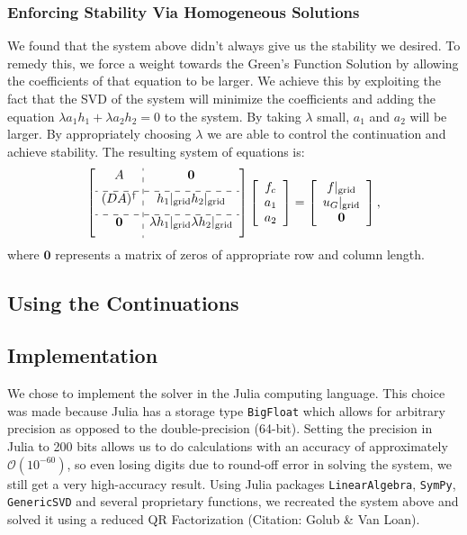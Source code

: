 \documentclass[11pt]{amsart}
\begin{document}
\subsubsection{Enforcing Stability Via Homogeneous Solutions}
We found that the system above didn't always give us the stability we desired. To remedy this, we force a weight towards the Green's Function Solution by allowing the coefficients of that equation to be larger.  We achieve this by exploiting the fact that the SVD of the system will minimize the coefficients and adding the equation $\lambda a_1 h_1 + \lambda a_2 h_2 = 0$ to the system.  By taking $\lambda$ small, $a_1$ and $a_2$ will be larger.  By appropriately choosing $\lambda$ we are able to control the continuation and achieve stability. 
The resulting system of equations is: 
\begin{equation}
\left[
\begin{array}{c:c}
A &  \mathbf{0} \\[6pt] \hdashline
(DA)^{\dagger} & h_1|_{\text{grid}} h_2|_{\text{grid}} \\[6pt] \hdashline
\mathbf{0} & \lambda h_1|_{\text{grid}}  \lambda h_2|_{\text{grid}} \\ [6pt]
\end{array} \right] 
\left[ 
\begin{array}{c}
f_c \\
a_1\\
a_2
\end{array}
\right]
= 
\left[ 
\begin{array}{c}
f|_{\text{grid}}\\
u_G|_{\text{grid}}\\
\mathbf{0}
\end{array}
\right],
\end{equation}
where $\mathbf{0}$ represents a matrix of zeros of appropriate row and column length.  




\subsection{Using the Continuations}

\subsection{Implementation}
We chose to implement the solver in the Julia computing language.  This choice was made because Julia has a storage type \texttt{BigFloat} which allows for arbitrary precision as opposed to the double-precision (64-bit).  Setting the precision in Julia to 200 bits allows us to do calculations with an accuracy of approximately $\mathcal{O}(10^{-60})$, so even losing digits due to round-off error in solving the system, we still get a very high-accuracy result.  Using Julia packages \texttt{LinearAlgebra}, \texttt{SymPy}, \texttt{GenericSVD} and several proprietary functions, we recreated the system above and solved it using a reduced QR Factorization (Citation: Golub \& Van Loan).
\end{document}
